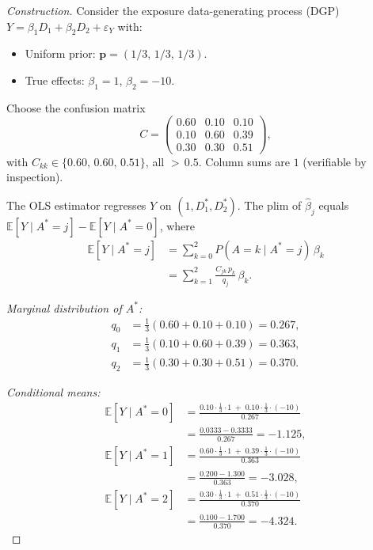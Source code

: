 \begin{proof}[Construction]
Consider the exposure data-generating process (DGP) $Y = \beta_1 D_1 + \beta_2 D_2 + \varepsilon_Y$ with:
\begin{itemize}
  \item Uniform prior: $\mathbf{p}=(1/3,\,1/3,\,1/3)$.
  \item True effects: $\beta_1=1$,\; $\beta_2=-10$.
\end{itemize}
Choose the confusion matrix
\[
  C = \begin{pmatrix}
    0.60 & 0.10 & 0.10\\
    0.10 & 0.60 & 0.39\\
    0.30 & 0.30 & 0.51
  \end{pmatrix},
\]
with $C_{kk}\in\{0.60,\,0.60,\,0.51\}$, all ${>}\,0.5$.
Column sums are $1$ (verifiable by inspection).

The OLS estimator regresses $Y$ on $(1,D_1^*,D_2^*)$.
The plim of $\hat\beta_j$ equals $\mathbb{E}[Y\mid A^*{=}j]-\mathbb{E}[Y\mid A^*{=}0]$, where
\begin{align*}
  \mathbb{E}[Y\mid A^*{=}j] &= \sum_{k=0}^{2} P(A{=}k\mid A^*{=}j)\,\beta_k\\
  &= \sum_{k=1}^{2}\frac{C_{jk}\,p_k}{q_j}\,\beta_k.
\end{align*}

\emph{Marginal distribution of $A^*$:}
\begin{align*}
  q_0 &= \tfrac{1}{3}(0.60+0.10+0.10)=0.267,\\
  q_1 &= \tfrac{1}{3}(0.10+0.60+0.39)=0.363,\\
  q_2 &= \tfrac{1}{3}(0.30+0.30+0.51)=0.370.
\end{align*}

\emph{Conditional means:}
\begin{align*}
  \mathbb{E}[Y\mid A^*{=}0]
  &= \tfrac{0.10\cdot\frac{1}{3}\cdot 1 \;+\; 0.10\cdot\frac{1}{3}\cdot({-}10)}{0.267}\\
  &= \tfrac{0.0333-0.3333}{0.267} = -1.125,\\[4pt]
  \mathbb{E}[Y\mid A^*{=}1]
  &= \tfrac{0.60\cdot\frac{1}{3}\cdot 1 \;+\; 0.39\cdot\frac{1}{3}\cdot({-}10)}{0.363}\\
  &= \tfrac{0.200-1.300}{0.363} = -3.028,\\[4pt]
  \mathbb{E}[Y\mid A^*{=}2]
  &= \tfrac{0.30\cdot\frac{1}{3}\cdot 1 \;+\; 0.51\cdot\frac{1}{3}\cdot({-}10)}{0.370}\\
  &= \tfrac{0.100-1.700}{0.370} = -4.324.
\end{align*}


\end{proof}
